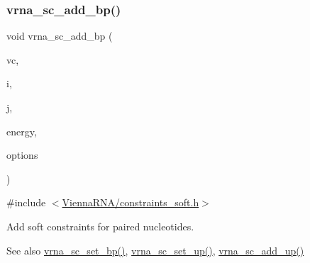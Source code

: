 \subsubsection{\texorpdfstring{vrna\+\_\+sc\+\_\+add\+\_\+bp()}{vrna\_sc\_add\_bp()}}
{\footnotesize\ttfamily void vrna\+\_\+sc\+\_\+add\+\_\+bp (\begin{DoxyParamCaption}\item[{\hyperlink{group__fold__compound_ga1b0cef17fd40466cef5968eaeeff6166}{vrna\+\_\+fold\+\_\+compound\+\_\+t} $\ast$}]{vc,  }\item[{int}]{i,  }\item[{int}]{j,  }\item[{\hyperlink{group__data__structures_ga31125aeace516926bf7f251f759b6126}{F\+L\+T\+\_\+\+O\+R\+\_\+\+D\+BL}}]{energy,  }\item[{unsigned int}]{options }\end{DoxyParamCaption})}



{\ttfamily \#include $<$\hyperlink{constraints__soft_8h}{Vienna\+R\+N\+A/constraints\+\_\+soft.\+h}$>$}



Add soft constraints for paired nucleotides. 

\begin{DoxySeeAlso}{See also}
\hyperlink{group__soft__constraints_ga8e4334b24bc91453fbcda490a4e331af}{vrna\+\_\+sc\+\_\+set\+\_\+bp()}, \hyperlink{group__soft__constraints_ga99ed63f3ef9e7fe3997932030487a344}{vrna\+\_\+sc\+\_\+set\+\_\+up()}, \hyperlink{group__soft__constraints_ga069915fe203a2c8e522dd37847177a09}{vrna\+\_\+sc\+\_\+add\+\_\+up()}
\end{DoxySeeAlso}

